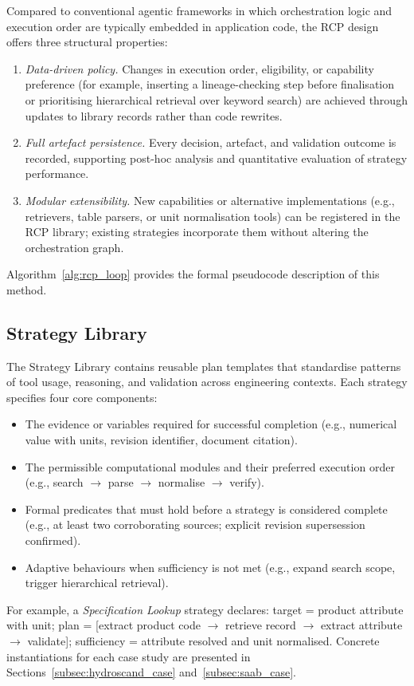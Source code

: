 \documentclass[largeformat]{interact}
\begin{document}
Compared to conventional agentic frameworks in which orchestration logic and execution order are typically embedded in application code, the RCP design offers three structural properties:
\begin{enumerate}
    \item \textit{Data-driven policy.} Changes in execution order, eligibility, or capability preference (for example, inserting a lineage-checking step before finalisation or prioritising hierarchical retrieval over keyword search) are achieved through updates to library records rather than code rewrites.
    \item \textit{Full artefact persistence.} Every decision, artefact, and validation outcome is recorded, supporting post-hoc analysis and quantitative evaluation of strategy performance.
    \item \textit{Modular extensibility.} New capabilities or alternative implementations (e.g., retrievers, table parsers, or unit normalisation tools) can be registered in the RCP library; existing strategies incorporate them without altering the orchestration graph.
\end{enumerate}

\noindent Algorithm~\ref{alg:rcp_loop} provides the formal pseudocode description of this method.

\subsection{Strategy Library}
\label{subsec:strategy_library}
The Strategy Library contains reusable plan templates that standardise patterns of tool usage, reasoning, and validation across engineering contexts. Each strategy specifies four core components:
\begin{itemize}[label=- ]
    \item {} The evidence or variables required for successful completion (e.g., numerical value with units, revision identifier, document citation).
    \item {} The permissible computational modules and their preferred execution order (e.g., search $\rightarrow$ parse $\rightarrow$ normalise $\rightarrow$ verify).
    \item {} Formal predicates that must hold before a strategy is considered complete (e.g., at least two corroborating sources; explicit revision supersession confirmed).
    \item {} Adaptive behaviours when sufficiency is not met (e.g., expand search scope, trigger hierarchical retrieval).
\end{itemize}
For example, a \emph{Specification Lookup} strategy declares: target = product attribute with unit; plan = [extract product code $\rightarrow$ retrieve record $\rightarrow$ extract attribute $\rightarrow$ validate]; sufficiency = attribute resolved and unit normalised. Concrete instantiations for each case study are presented in Sections~\ref{subsec:hydroscand_case} and~\ref{subsec:saab_case}.
\end{document}
